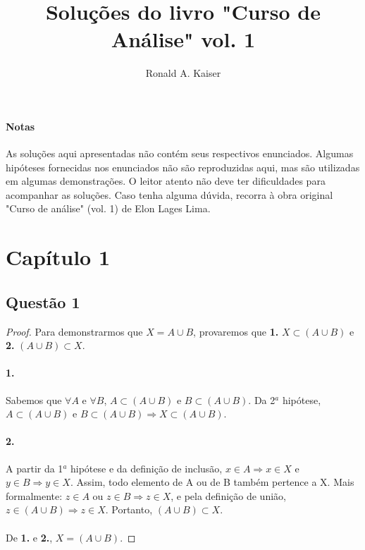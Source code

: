 \documentclass[11pt,a4paper]{report}
\title{Soluções do livro "Curso de Análise" vol. 1}
\author{Ronald A. Kaiser}
\begin{document}
    \maketitle
    \newpage
    
    \paragraph{Notas}
    As soluções aqui apresentadas não contém seus respectivos enunciados. Algumas hipóteses fornecidas nos enunciados não são reproduzidas aqui, mas são utilizadas em algumas demonstrações. O leitor atento não deve ter dificuldades para acompanhar as soluções. Caso tenha alguma dúvida, recorra à obra original "Curso de análise" (vol. 1) de Elon Lages Lima.

    \section{Capítulo 1}

    \subsection{Questão 1}
    \begin{proof}
    Para demonstrarmos que $X = A \cup B$, provaremos que \textbf{1.} $X \subset (A \cup B)$ e \textbf{2.} $(A \cup B) \subset X$.

    \paragraph{1.}
    Sabemos que $\forall A$ e $\forall B$, $A \subset (A \cup B)$ e $B \subset (A \cup B)$. 
    Da 2$^a$ hipótese, $A \subset (A \cup B)$ e $B \subset (A \cup B) \Rightarrow X \subset (A \cup B)$.

    \paragraph{2.}
    A partir da 1$^a$ hipótese e da definição de inclusão, $x \in A \Rightarrow x \in X$ e $y \in B \Rightarrow y \in X$. Assim, todo elemento de A ou de B também pertence a X. Mais formalmente: $z \in A$ ou $z \in B \Rightarrow z \in X$, e  pela definição de união, $z \in (A \cup B) \Rightarrow z \in X$. Portanto, $(A \cup B) \subset X$.

    \paragraph{}
    De \textbf{1.} e \textbf{2.}, $X = (A \cup B)$.
    \end{proof}
\end{document}
